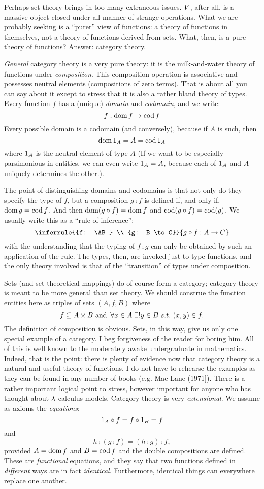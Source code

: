 Perhaps set theory brings in too many extraneous issues. $V$, after all, is a massive object closed under all manner of strange operations. What we are probably seeking is a ``purer'' view of functions: a theory of functions in themselves, not a theory of functions derived from sets. What, then, is a pure theory of functions? Answer: category theory.

{\it General} category theory is a very pure theory: it is the milk-and-water theory of functions under {\it composition}. This composition operation is associative and possesses neutral elements (compositions of zero terms). That is about all you can say about it except to stress that it is also a rather bland theory of types. Every function $f$ has a (unique) {\it domain} and {\it codomain}, and we write:
$$f: \mathop{\rm dom} f \rightarrow \mathop{\rm cod} f$$
%
Every possible domain is a codomain (and conversely), because if $A$ is such, then
$$\mathop{\rm dom} {\mathrm 1}_A = A = \mathop{\rm cod} {\mathrm 1}_A$$
%
where ${\mathrm 1}_A$ is the neutral element of type $A$ (If we want to be especially parsimonious in entities, we can even write ${\mathrm 1}_A = A$, because each of ${\mathrm 1}_A$ and $A$ uniquely determines the other.).

The point of distinguishing domains and codomains is that not only do they specify the type of $f$, but a composition $g \comp f$ is
defined if, and only if, $\mathop{\rm dom} g = \mathop{\rm cod} f$. And then $\mathop{\rm dom}(g \circ f) = \mathop{\rm dom} f$ and $\mathop{\rm cod} (g \circ f) = \mathop{\rm cod} (g)$. We usually write this as a ``rule of inference'':
$$
\inferrule
  {{f: \AB} \\ {g: B \to C}}
  {g \comp f: A \to C}
$$
with the understanding that the typing of $f \comp  g$ can only be obtained by such an application of the rule. The types, then, are invoked just to type functions, and the only theory involved is that of the ``transition'' of types under composition.

Sets (and set-theoretical mappings) do of course form a category; category theory is meant to be more general than set theory. We should construe the function entities here as triples of sets $(A,f,B)$ where
$$
f \subseteq A \times B {\textrm{ and }}\, \forall x \in A \,\, \exists! y \in B\,\, s.t. \,\, (x,y) \in f.
$$
%
The definition of composition is obvious. Sets, in this way, give us only one special example of a category.
I beg forgiveness of the reader for boring him. All of this is well known to the moderately awake undergraduate in mathematics. Indeed, that is the point: there is plenty of evidence now that category theory is a natural and useful theory of functions. I do not have to rehearse the examples as they can be found in any number of books (e.g. Mac Lane (1971]).
There is a rather important logical point to stress, however
important for anyone who has thought about $\lambda$-calculus models. Category theory is very {\it extensional}. We assume as axioms the {\it equations}:
%
$${\mathrm 1}_A \circ f = f \circ {\mathrm 1}_B =  f$$
%
and
$$h\comp (g \comp f) = (h \comp g) \comp f,$$
%
provided $A= \mathop{\rm dom} f$ and $B = \mathop{\rm cod} f$ and the double compositions are defined. These are {\it functional} equations, and they say that two functions defined in {\it different} ways are in fact {\it identical}.
Furthermore, identical things can everywhere replace one another.

